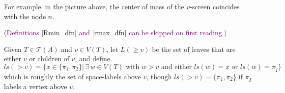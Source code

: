 \documentclass[11pt]{article}
\theoremstyle{definition}
\theoremstyle{remark}
\def\cT{\mathcal{T}}
\def\rI{{\mathring{I}}}
\def\Ch{{{Ch}}}
\def\cmt#1{\textcolor{purple}{(#1)}}
\def\tn#1{\textnormal{#1}}
\begin{document}
For example, in the picture above, the center of mass of the $v$-screen coincides with the node $n$.

\cmt{Definitions \ref{Rmin_dfn} and \ref{rmax_dfn} can be skipped on first reading.}


Given $T\in\cT(A)$ and $v\in V(T)$, let $L(\ge v)$ be the set of leaves that are either $v$ or children of $v$,
and define
\[
ls(> v)=\{x \in\{\pi_1,\pi_2\}\big|\, \exists\, w \in V(T) \text{ with } w>v \text{ and either } ls(w)=x \text{ or } ls(w)=\pi_\rI \}
\]
which is roughly the set of space-labels above $v$, though $ls(>v)=\{\pi_1, \pi_2\}$ if $\pi_\rI$ labels a vertex above $v$.  

%
%
\end{document}

